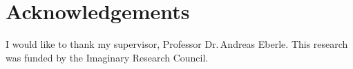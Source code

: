 \section*{Acknowledgements}

I would like to thank my supervisor, Professor Dr.\,Andreas Eberle. This
research was funded by the Imaginary Research Council.
